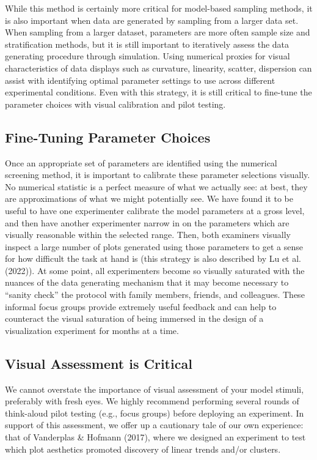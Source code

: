 \documentclass[
  10pt,
  letterpaper,
  DIV=11,
  numbers=noendperiod]{scrartcl}
\begin{document}
While this method is certainly more critical for model-based sampling
methods, it is also important when data are generated by sampling from a
larger data set. When sampling from a larger dataset, parameters are
more often sample size and stratification methods, but it is still
important to iteratively assess the data generating procedure through
simulation. Using numerical proxies for visual characteristics of data
displays such as curvature, linearity, scatter, dispersion can assist
with identifying optimal parameter settings to use across different
experimental conditions. Even with this strategy, it is still critical
to fine-tune the parameter choices with visual calibration and pilot
testing.

\subsection{Fine-Tuning Parameter
Choices}\label{fine-tuning-parameter-choices}

Once an appropriate set of parameters are identified using the numerical
screening method, it is important to calibrate these parameter
selections visually. No numerical statistic is a perfect measure of what
we actually see: at best, they are approximations of what we might
potentially see. We have found it to be useful to have one experimenter
calibrate the model parameters at a gross level, and then have another
experimenter narrow in on the parameters which are visually reasonable
within the selected range. Then, both examiners visually inspect a large
number of plots generated using those parameters to get a sense for how
difficult the task at hand is (this strategy is also described by Lu et
al. (2022)). At some point, all experimenters become so visually
saturated with the nuances of the data generating mechanism that it may
become necessary to ``sanity check'' the protocol with family members,
friends, and colleagues. These informal focus groups provide extremely
useful feedback and can help to counteract the visual saturation of
being immersed in the design of a visualization experiment for months at
a time.

\subsection{Visual Assessment is
Critical}\label{visual-assessment-is-critical}

We cannot overstate the importance of visual assessment of your model
stimuli, preferably with fresh eyes. We highly recommend performing
several rounds of think-aloud pilot testing (e.g., focus groups) before
deploying an experiment. In support of this assessment, we offer up a
cautionary tale of our own experience: that of Vanderplas \& Hofmann
(2017), where we designed an experiment to test which plot aesthetics
promoted discovery of linear trends and/or clusters.
\end{document}
